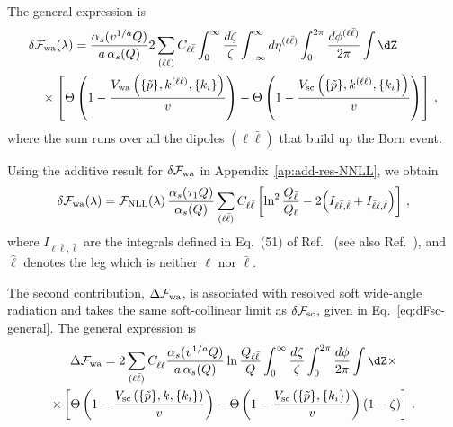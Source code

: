 The general expression is
\begin{equation}
\label{eq:dFwa-general}
\begin{aligned}
	&\delta\mathcal{F}_{\mathrm{wa}}(\lambda)=\frac{\alpha_s(v^{1/a}Q)}{a\,\alpha_s(Q)}2\sum_{(\ell\bar\ell)}C_{\ell\bar\ell}\int_0^\infty \frac{d\zeta}{\zeta}
	\int_{-\infty}^\infty d\eta^{(\ell\bar\ell)}\int_0^{2\pi}\frac{d\phi^{(\ell\bar\ell)}}{2\pi} \int \dZ\\
	&\quad\times\left[\Theta\left(1-\frac{V_{\mathrm{wa}}\left(\{\tilde{p}\}, k^{(\ell\bar\ell)},\{k_i\}\right)}{v}\right) -\Theta\left(1-\frac{V_{\mathrm{sc}}\left(\{\tilde{p}\}, k^{(\ell\bar\ell)},\{k_i\}\right)}{v}\right)\right]\,,
\end{aligned}
\end{equation}
where the sum runs over all the dipoles $(\ell\bar\ell)$ that build up the Born event. 

Using the additive result for $\delta\mathcal{F}_{\rm wa}$ in Appendix~\ref{ap:add-res-NNLL},
we obtain
\begin{equation}
    \delta\mathcal{F}_{\mathrm{wa}}(\lambda) =
    \mathcal{F}_{\rm NLL}(\lambda)\,
    \frac{\alpha_s(\tau_1 Q)}{\alpha_s(Q)}
    \sum_{(\ell\bar\ell)}C_{\ell\bar\ell}
    \left[\ln^2\frac{Q_{\bar\ell}}{Q_\ell}
    - 2\!\left(I_{\ell\bar\ell,\hat\ell}
    + I_{\bar\ell\ell,\hat\ell}\right)\right]\,,
\end{equation}
where $I_{\ell\bar\ell,\hat\ell}$ are the integrals defined in Eq.~(51)
of Ref.~\cite{Alioli:2023rxx} (see also Ref.~\cite{Jouttenus:2011wh}),
and $\hat\ell$ denotes the leg which is neither $\ell$ nor $\bar\ell$.

The second contribution, $\Delta\mathcal{F}_{\rm wa}$, is associated
with resolved soft wide-angle radiation and takes the same
soft-collinear limit as $\delta\mathcal{F}_{\rm sc}$, given in Eq.~\eqref{eq:dFsc-general}. 
The general expression is
\begin{multline}
\label{eq:DFwa-general}
	\Delta\mathcal{F}_{\mathrm{wa}}=2\sum_{(\ell\bar\ell)}C_{\ell\bar\ell}\frac{\alpha_s(v^{1/a}Q)}{a\,\alpha_s(Q)}\ln\frac{Q_{\ell\bar\ell}}{Q}\int_0^\infty \frac{d\zeta}{\zeta}
	\int_0^{2\pi}\frac{d\phi}{2\pi}\int \dZ\times \\
	\times \left[\Theta\left(1-\frac{V_{\mathrm{sc}}\left(\{\tilde{p}\}, k,\{k_i\}\right)}{v}\right) -\Theta\left(1-\frac{V_{\mathrm{sc}}\left(\{\tilde{p}\}, \{k_i\}\right)}{v}\right)\left(1-\zeta\right)\right]\,.
\end{multline}

